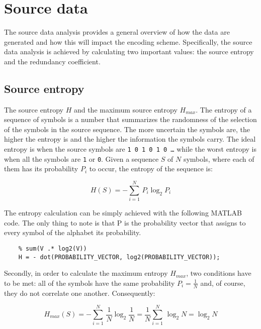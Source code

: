 \section{Source data}

The source data analysis provides a general overview of how the data are generated and how this will impact the encoding scheme. Specifically, the source data analysis is achieved by calculating two important values: the source entropy and the redundancy coefficient.

\subsection{Source entropy}

The source entropy $H$ and the maximum source entropy $H_{max}$. The entropy of a sequence of symbols is a number that summarizes the randomness of the selection of the symbols in the source sequence. The more uncertain the symbols are, the higher the entropy is and the higher the information the symbols carry. The ideal entropy is when the source symbols are \texttt{1 0 1 0 1 0 \dots} while the worst entropy is when all the symbols are \texttt{1} or \texttt{0}. Given a sequence $S$ of $N$ symbols, where each of them has its probability $P_i$ to occur, the entropy of the sequence is:

\begin{equation*}
    H(S) = - \sum_{i = 1}^{N}\,P_i \log_2 P_i
\end{equation*}

\noindent The entropy calculation can be simply achieved with the following MATLAB code. The only thing to note is that P is the probability vector that assigns to every symbol of the alphabet its probability. 

\begin{lstlisting}  
    % sum(V .* log2(V))
    H = - dot(PROBABILITY_VECTOR, log2(PROBABILITY_VECTOR));
\end{lstlisting}

\noindent Secondly, in order to calculate the maximum entropy $H_{max}$, two conditions have to be met: all of the symbols have the same probability $P_i = \frac{1}{N}$ and, of course, they do not correlate one another. Consequently:

\begin{equation*}
    H_{max}(S) = - \sum_{i = 1}^{N}\,\frac{1}{N} \log_2 \frac{1}{N} = \frac{1}{N} \sum_{i = 1}^{N}\, \log_2 N = \log_2N
\end{equation*}

